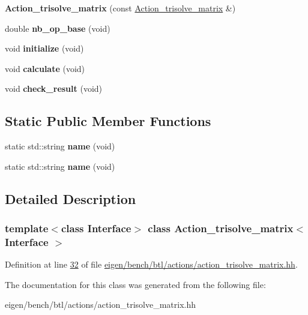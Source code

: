 \begin{DoxyCompactItemize}
{\bfseries Action\+\_\+trisolve\+\_\+matrix} (const \hyperlink{class_action__trisolve__matrix}{Action\+\_\+trisolve\+\_\+matrix} \&)
\item 
\mbox{\label{class_action__trisolve__matrix_aef787d79a7c993c4043afb05f583025d}} 
double {\bfseries nb\+\_\+op\+\_\+base} (void)
\item 
\mbox{\label{class_action__trisolve__matrix_a2770b4c49eeea866ea5a12e6aa2becd1}} 
void {\bfseries initialize} (void)
\item 
\mbox{\label{class_action__trisolve__matrix_a888cafb9f52eaf774e010aee4f88402f}} 
void {\bfseries calculate} (void)
\item 
\mbox{\label{class_action__trisolve__matrix_a010df6dd748507281b2b15922bc51e84}} 
void {\bfseries check\+\_\+result} (void)
\end{DoxyCompactItemize}
\subsection*{Static Public Member Functions}
\begin{DoxyCompactItemize}
\item 
\mbox{\label{class_action__trisolve__matrix_a3063789b6d84efaeef1b6f37e22abbb0}} 
static std\+::string {\bfseries name} (void)
\item 
\mbox{\label{class_action__trisolve__matrix_a3063789b6d84efaeef1b6f37e22abbb0}} 
static std\+::string {\bfseries name} (void)
\end{DoxyCompactItemize}


\subsection{Detailed Description}
\subsubsection*{template$<$class Interface$>$\newline
class Action\+\_\+trisolve\+\_\+matrix$<$ Interface $>$}



Definition at line \hyperlink{eigen_2bench_2btl_2actions_2action__trisolve__matrix_8hh_source_l00032}{32} of file \hyperlink{eigen_2bench_2btl_2actions_2action__trisolve__matrix_8hh_source}{eigen/bench/btl/actions/action\+\_\+trisolve\+\_\+matrix.\+hh}.



The documentation for this class was generated from the following file\+:\begin{DoxyCompactItemize}
\item 
eigen/bench/btl/actions/action\+\_\+trisolve\+\_\+matrix.\+hh\end{DoxyCompactItemize}
